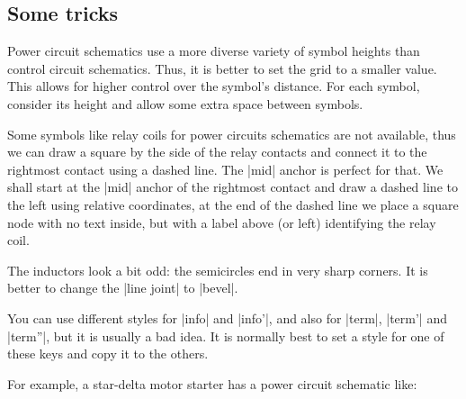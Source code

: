 \documentclass[a4paper]{ltxdoc}
\begin{document}
\subsection{Some tricks}
Power circuit schematics use a more diverse variety of symbol heights than control circuit schematics. Thus, it is better to set the grid to a smaller value. This allows for higher control over the symbol's distance. For each symbol, consider its height and allow some extra space between symbols.

Some symbols like relay coils for power circuits schematics are not available, thus we can draw a square by the side of the relay contacts and connect it to the rightmost contact using a dashed line. The |mid| anchor is perfect for that. We shall start at the |mid| anchor of the rightmost contact and draw a dashed line to the left using relative coordinates, at the end of the dashed line we place a square node with no text inside, but with a label above (or left) identifying the relay coil.

The inductors look a bit odd: the semicircles end in very sharp corners. It is better to change the |line joint| to |bevel|. 

You can use different styles for |info| and |info'|, and also for |term|, |term'| and |term''|, but it is usually a bad idea. It is normally best to set a style for one of these keys and copy it to the others.

For example, a star-delta motor starter has a power circuit schematic like:

\end{document}
